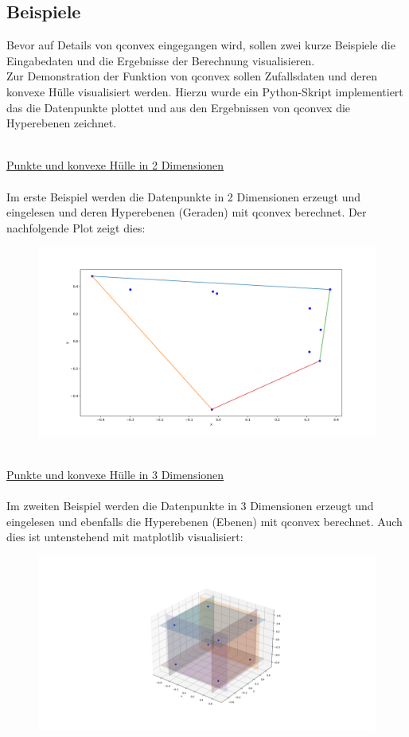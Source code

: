 \documentclass[12pt]{scrartcl}
\begin{document}
\subsection{Beispiele}
Bevor auf Details von qconvex eingegangen wird, sollen zwei kurze Beispiele die Eingabedaten und die Ergebnisse der Berechnung visualisieren.\\
Zur Demonstration der Funktion von qconvex sollen Zufallsdaten und deren konvexe Hülle visualisiert werden. Hierzu wurde ein Python-Skript implementiert das die Datenpunkte plottet und aus den Ergebnissen von qconvex die Hyperebenen zeichnet. 

\ \\
\underline{Punkte und konvexe Hülle in 2 Dimensionen}\\~\\
Im erste Beispiel werden die Datenpunkte in 2 Dimensionen erzeugt und eingelesen und deren Hyperebenen (Geraden) mit qconvex berechnet. Der nachfolgende Plot zeigt dies:
\begin{figure}[H]
    \centering
    \includegraphics[scale=0.3]{2D_plot.png}
\end{figure}
\ \\
\underline{Punkte und konvexe Hülle in 3 Dimensionen}\\~\\
Im zweiten Beispiel werden die Datenpunkte in 3 Dimensionen erzeugt und eingelesen und ebenfalls die Hyperebenen (Ebenen) mit qconvex berechnet. Auch dies ist untenstehend mit matplotlib visualisiert:
\begin{figure}[H]
    \centering
    \includegraphics[scale=0.3]{cubeplot.png}
\end{figure}
\end{document}
